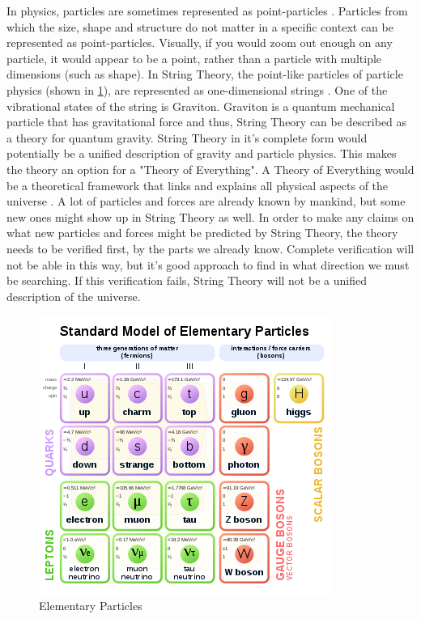 \documentclass[../paper.tex]{subfiles}
\begin{document}
In physics, particles are sometimes represented as point-particles \cite{PointParticle}. Particles from which the size, shape and structure do not matter in a specific context can be represented as point-particles. Visually, if you would zoom out enough on any particle, it would appear to be a point, rather than a particle with multiple dimensions (such as shape). In String Theory, the point-like particles of particle physics (shown in \ref{Elementary Particles}), are represented as one-dimensional strings \cite{StringTheory}. One of the vibrational states of the string is Graviton. Graviton is a quantum mechanical particle that has gravitational force and thus, String Theory can be described as a theory for quantum gravity. String Theory in it's complete form would potentially be a unified description of gravity and particle physics. This makes the theory an option for a "Theory of Everything". A Theory of Everything would be a theoretical framework that links and explains all physical aspects of the universe \cite{TheoryOfEverything}. A lot of particles and forces are already known by mankind, but some new ones might show up in String Theory as well. In order to make any claims on what new particles and forces might be predicted by String Theory, the theory needs to be verified first, by the parts we already know. Complete verification will not be able in this way, but it's good approach to find in what direction we must be searching. If this verification fails, String Theory will not be a unified description of the universe. 

\begin{figure}[!htb]
\centering
\includegraphics[scale = 0.5]{String Theory/ElementaryParticles.png}
\caption{Elementary Particles}
\label{Elementary Particles}
\end{figure}
\end{document}
